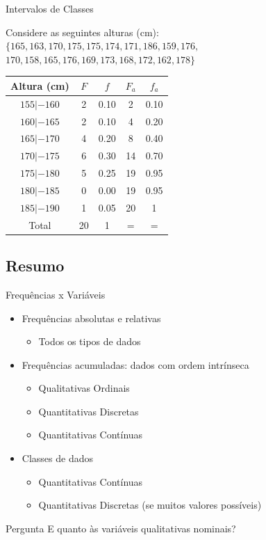 \documentclass{beamer}
\begin{document}
\begin{frame}{Intervalos de Classes}

  \begin{example}
  Considere as seguintes alturas (cm):
$ \{ 165,163,170,175,175,174,171,186,159,176,$
$170,158,165,176,169,173,168,172,162,178 \} $

\centering\begin{tabular}{|c|c|c|c|c|}
  \hline
  Altura (cm) & $F$ & $f$ & $F_a$ & $f_a$ \\
  \hline
  $155 |- 160$ & 2 & 0.10 & 2 & 0.10\\%
  $160 |- 165$ & 2 & 0.10 & 4 & 0.20\\%
  $165 |- 170$ & 4 & 0.20 & 8 & 0.40\\%
  $170 |- 175$ & 6 & 0.30 & 14 & 0.70\\%
  $175 |- 180$ & 5 & 0.25 & 19 & 0.95\\%
  $180 |- 185$ & 0 & 0.00 & 19 & 0.95\\%
  $185 |- 190$ & 1 & 0.05 & 20 & 1\\%
  \hline
  \hline
  Total & 20 & 1 & = & =\\
  \hline
\end{tabular}
  \end{example}

\end{frame}
\subsection{Resumo}

\begin{frame}{Frequências x Variáveis}
  \begin{itemize}
  \item Frequências absolutas e relativas
    \begin{itemize}
    \item \alert{Todos} os tipos de dados
    \end{itemize}
  \item Frequências acumuladas: dados com ordem intrínseca
    \begin{itemize}
    \item Qualitativas Ordinais
    \item Quantitativas Discretas
    \item Quantitativas Contínuas
    \end{itemize}
  \item Classes de dados
    \begin{itemize}
    \item Quantitativas Contínuas
    \item Quantitativas Discretas (se muitos valores possíveis)
    \end{itemize}
  \end{itemize}
  \begin{block}{Pergunta}
    E quanto às variáveis qualitativas nominais?
  \end{block}
\end{frame}
\end{document}
